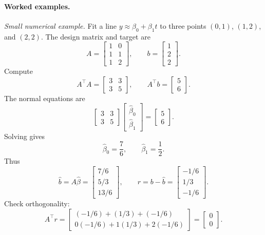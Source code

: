 \paragraph{Worked examples.}
\emph{Small numerical example.} Fit a line \(y\approx \beta_0+\beta_1t\) to three points \((0,1)\), \((1,2)\), and \((2,2)\). The design matrix and target are
\[
A=
\begin{bmatrix}
1&0\\
1&1\\
1&2
\end{bmatrix},
\qquad
b=
\begin{bmatrix}
1\\2\\2
\end{bmatrix}.
\]
Compute
\[
A^\top A=
\begin{bmatrix}
3&3\\
3&5
\end{bmatrix},
\qquad
A^\top b=
\begin{bmatrix}
5\\6
\end{bmatrix}.
\]
The normal equations are
\[
\begin{bmatrix}
3&3\\
3&5
\end{bmatrix}
\begin{bmatrix}\hat\beta_0\\\hat\beta_1\end{bmatrix}
=
\begin{bmatrix}5\\6\end{bmatrix}.
\]
Solving gives
\[
\hat\beta_0=\frac{7}{6},
\qquad
\hat\beta_1=\frac{1}{2}.
\]
Thus
\[
\hat b=A\hat\beta
=
\begin{bmatrix}
7/6\\
5/3\\
13/6
\end{bmatrix},
\qquad
r=b-\hat b
=
\begin{bmatrix}
-1/6\\
1/3\\
-1/6
\end{bmatrix}.
\]
Check orthogonality:
\[
A^\top r=
\begin{bmatrix}
(-1/6)+(1/3)+(-1/6)\\
0(-1/6)+1(1/3)+2(-1/6)
\end{bmatrix}
=
\begin{bmatrix}0\\0\end{bmatrix}.
\]

